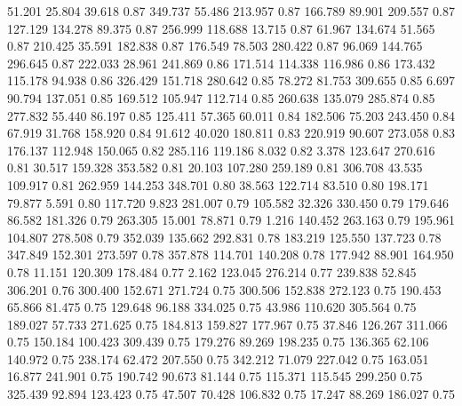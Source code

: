   51.201   25.804   39.618         0.87
 349.737   55.486  213.957         0.87
 166.789   89.901  209.557         0.87
 127.129  134.278   89.375         0.87
 256.999  118.688   13.715         0.87
  61.967  134.674   51.565         0.87
 210.425   35.591  182.838         0.87
 176.549   78.503  280.422         0.87
  96.069  144.765  296.645         0.87
 222.033   28.961  241.869         0.86
 171.514  114.338  116.986         0.86
 173.432  115.178   94.938         0.86
 326.429  151.718  280.642         0.85
  78.272   81.753  309.655         0.85
   6.697   90.794  137.051         0.85
 169.512  105.947  112.714         0.85
 260.638  135.079  285.874         0.85
 277.832   55.440   86.197         0.85
 125.411   57.365   60.011         0.84
 182.506   75.203  243.450         0.84
  67.919   31.768  158.920         0.84
  91.612   40.020  180.811         0.83
 220.919   90.607  273.058         0.83
 176.137  112.948  150.065         0.82
 285.116  119.186    8.032         0.82
   3.378  123.647  270.616         0.81
  30.517  159.328  353.582         0.81
  20.103  107.280  259.189         0.81
 306.708   43.535  109.917         0.81
 262.959  144.253  348.701         0.80
  38.563  122.714   83.510         0.80
 198.171   79.877    5.591         0.80
 117.720    9.823  281.007         0.79
 105.582   32.326  330.450         0.79
 179.646   86.582  181.326         0.79
 263.305   15.001   78.871         0.79
   1.216  140.452  263.163         0.79
 195.961  104.807  278.508         0.79
 352.039  135.662  292.831         0.78
 183.219  125.550  137.723         0.78
 347.849  152.301  273.597         0.78
 357.878  114.701  140.208         0.78
 177.942   88.901  164.950         0.78
  11.151  120.309  178.484         0.77
   2.162  123.045  276.214         0.77
 239.838   52.845  306.201         0.76
 300.400  152.671  271.724         0.75
 300.506  152.838  272.123         0.75
 190.453   65.866   81.475         0.75
 129.648   96.188  334.025         0.75
  43.986  110.620  305.564         0.75
 189.027   57.733  271.625         0.75
 184.813  159.827  177.967         0.75
  37.846  126.267  311.066         0.75
 150.184  100.423  309.439         0.75
 179.276   89.269  198.235         0.75
 136.365   62.106  140.972         0.75
 238.174   62.472  207.550         0.75
 342.212   71.079  227.042         0.75
 163.051   16.877  241.901         0.75
 190.742   90.673   81.144         0.75
 115.371  115.545  299.250         0.75
 325.439   92.894  123.423         0.75
  47.507   70.428  106.832         0.75
  17.247   88.269  186.027         0.75

